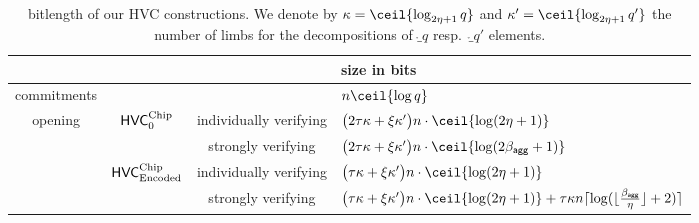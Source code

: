 \begin{remark}
\begin{table}\centering
 \begin{tabular}{ccc@{\hskip 3.5ex}l}
  & & & size in bits \\\toprule
  commitments & & & $n\ceil{\log q}$\\
  \hline
  \multirow{4}{*}{opening}& \multirow{2}{*}{$\mathsf{HVC}^{\textup{Chip}}_{0}$} &individually verifying & $\bigl(2\tau\limbs + \xi\limbs'\bigr)n\cdot \ceil{\log(2\eta+1)}$\\\cline{3-4}
                          &                                   &strongly verifying & $\bigl(2\tau\limbs + \xi\limbs'\bigr)n\cdot \ceil{\log(2\bagg+1)}$  \\\cline{2-4}
                          & \multirow{2}{*}{$\mathsf{HVC}_{\textup{Encoded}}^{\textup{Chip}}$}    &individually verifying & $\bigl(\tau\limbs + \xi\limbs'\bigr)n\cdot \ceil{\log(2\eta+1)}$\\\cline{3-4}
                          &                                   &strongly verifying & $\bigl(\tau\limbs + \xi\limbs'\bigr)n\cdot \ceil{\log(2\eta+1)}+ \tau\limbs n\normalceil{\log (\lfloor\frac{\bagg}{\eta}\rfloor+2)}$\\
                          \hline
 \end{tabular}
 \medskip %
 \caption{bitlength of our HVC constructions. We denote by $\limbs = \ceil{\log_{2\eta+1}q}$ and $\limbs' = \ceil{\log_{2\eta+1}q'}$ the number of limbs for the decompositions of $\ring_q$ resp.\ $\ring_{q'}$ elements.}
 \label{table:hvcsizes}
\end{table}
\end{remark}
